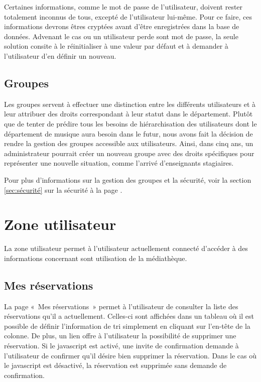 \documentclass[letter, 11pt]{report}
\begin{document}
Certaines informations, comme le mot de passe de l'utilisateur, doivent rester totalement inconnus de tous, excepté de l'utilisateur lui-même. Pour ce faire, ces informations devrons êtres cryptées avant d'être enregistrées dans la base de données. Advenant le cas ou un utilisateur perde sont mot de passe, la seule solution consite à le réinitialiser à une valeur par défaut et à demander à l'utilisateur d'en définir un nouveau.

\subsection{Groupes}
Les groupes servent à effectuer une distinction entre les différents utilisateurs et à leur attribuer des droits correspondant à leur statut dans le département. Plutôt que de tenter de prédire tous les besoins de hiérarchisation des utilisateurs dont le département de musique aura besoin dans le futur, nous avons fait la décision de rendre la gestion des groupes accessible aux utilisateurs. Ainsi, dans cinq ans, un administrateur pourrait créer un nouveau groupe avec des droits spécifiques pour représenter une nouvelle situation, comme l'arrivé d'enseignants stagiaires.

Pour plus d'informations sur la gestion des groupes et la sécurité, voir la section \ref{sec:sécurité} sur la sécurité à la page \pageref{sec:sécurité}.

\section{Zone utilisateur}
La zone utilisateur permet à l'utilisateur actuellement connecté d'accéder à des informations concernant sont utilisation de la médiathèque.

\subsection{Mes réservations}
La page «~Mes réservations~» permet à l'utilisateur de consulter la liste des réservations qu'il a actuellement. Celles-ci sont affichées dans un tableau où il est possible de définir l'information de tri simplement en cliquant sur l'en-tête de la colonne. De plus, un lien offre à l'utilisateur la possibilité de supprimer une réservation. Si le javascript est activé, une invite de confirmation demande à l'utilisateur de confirmer qu'il désire bien supprimer la réservation. Dans le cas où le javascript est désactivé, la réservation est supprimée sans demande de confirmation.
\end{document}
